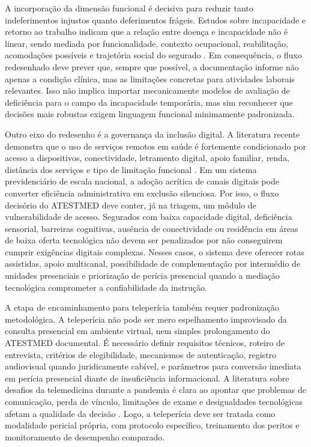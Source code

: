 \documentclass[12pt,a4paper]{article}
\begin{document}
A incorporação da dimensão funcional é decisiva para reduzir tanto indeferimentos injustos quanto deferimentos frágeis. Estudos sobre incapacidade e retorno ao trabalho indicam que a relação entre doença e incapacidade não é linear, sendo mediada por funcionalidade, contexto ocupacional, reabilitação, acomodações possíveis e trajetória social do segurado \parencite{gabbay2011niceguidanceonlongtermsicknessandincapacity, przysada2019anassessmentofworkabilityafterthecompletionofre, deveau2011workplaceaccommodationandauditbasedevaluationprocess}. Em consequência, o fluxo redesenhado deve prever que, sempre que possível, a documentação informe não apenas a condição clínica, mas as limitações concretas para atividades laborais relevantes. Isso não implica importar mecanicamente modelos de avaliação de deficiência para o campo da incapacidade temporária, mas sim reconhecer que decisões mais robustas exigem linguagem funcional minimamente padronizada.

Outro eixo do redesenho é a governança da inclusão digital. A literatura recente demonstra que o uso de serviços remotos em saúde é fortemente condicionado por acesso a dispositivos, conectividade, letramento digital, apoio familiar, renda, distância dos serviços e tipo de limitação funcional \parencite{albasheer2026telemedicineutilizationanddigitalinclusionamongpe, m2024astudyofdisabilityseveritybarriersandfacilitatingfactor, gao2019disabilityconcentrationandaccesstorehabilitationservice}. Em um sistema previdenciário de escala nacional, a adoção acrítica de canais digitais pode converter eficiência administrativa em exclusão silenciosa. Por isso, o fluxo decisório do ATESTMED deve conter, já na triagem, um módulo de vulnerabilidade de acesso. Segurados com baixa capacidade digital, deficiência sensorial, barreiras cognitivas, ausência de conectividade ou residência em áreas de baixa oferta tecnológica não devem ser penalizados por não conseguirem cumprir exigências digitais complexas. Nesses casos, o sistema deve oferecer rotas assistidas, apoio multicanal, possibilidade de complementação por intermédio de unidades presenciais e priorização de perícia presencial quando a mediação tecnológica comprometer a confiabilidade da instrução.

A etapa de encaminhamento para teleperícia também requer padronização metodológica. A teleperícia não pode ser mero espelhamento improvisado da consulta presencial em ambiente virtual, nem simples prolongamento do ATESTMED documental. É necessário definir requisitos técnicos, roteiro de entrevista, critérios de elegibilidade, mecanismos de autenticação, registro audiovisual quando juridicamente cabível, e parâmetros para conversão imediata em perícia presencial diante de insuficiência informacional. A literatura sobre desafios da telemedicina durante a pandemia é clara ao apontar que problemas de comunicação, perda de vínculo, limitações de exame e desigualdades tecnológicas afetam a qualidade da decisão \parencite{ftouni2022challengesoftelemedicineduringthecovid19pandemica}. Logo, a teleperícia deve ser tratada como modalidade pericial própria, com protocolo específico, treinamento dos peritos e monitoramento de desempenho comparado.
\end{document}
